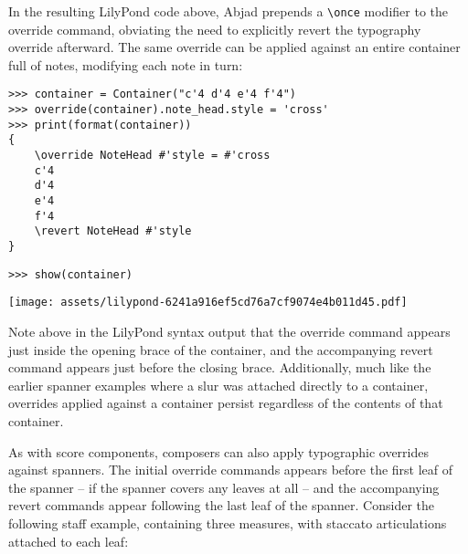 \noindent In the resulting LilyPond code above, Abjad prepends a
\texttt{\textbackslash{}once} modifier to the override command, obviating the
need to explicitly revert the typography override afterward. The same override
can be applied against an entire container full of notes, modifying each note
in turn:

\begin{comment}
<abjad>
container = Container("c'4 d'4 e'4 f'4")
override(container).note_head.style = 'cross'
print(format(container))
show(container)
</abjad>
\end{comment}

\begin{abjadbookoutput}
\begin{singlespacing}
\vspace{-0.5\baselineskip}
\begin{verbatim}
>>> container = Container("c'4 d'4 e'4 f'4")
>>> override(container).note_head.style = 'cross'
>>> print(format(container))
{
    \override NoteHead #'style = #'cross
    c'4
    d'4
    e'4
    f'4
    \revert NoteHead #'style
}
\end{verbatim}
\begin{verbatim}
>>> show(container)
\end{verbatim}
\noindent\texttt{[image: assets/lilypond-6241a916ef5cd76a7cf9074e4b011d45.pdf]}
\end{singlespacing}
\end{abjadbookoutput}

\noindent Note above in the LilyPond syntax output that the override command
appears just inside the opening brace of the container, and the accompanying
revert command appears just before the closing brace. Additionally, much like
the earlier spanner examples where a slur was attached directly to a container,
overrides applied against a container persist regardless of the contents of
that container.

As with score components, composers can also apply typographic overrides
against spanners. The initial override commands appears before the first leaf
of the spanner -- if the spanner covers any leaves at all -- and the
accompanying revert commands appear following the last leaf of the spanner.
Consider the following staff example, containing three measures, with staccato
articulations attached to each leaf:

\begin{comment}
<abjad>
staff = Staff()
staff.append(Measure((3, 4), "c'4 d' r"))
staff.append(Measure((5, 4), r"e'4 \times 2/3 { f' g' r4 } a' b"))
staff.append(Measure((2, 4), "c''8 g' c'4"))
articulation = Articulation('staccato')
for leaf in staff.select_leaves():
    if isinstance(leaf, Note):
        attach(articulation, leaf)

show(staff)
</abjad>
\end{comment}


